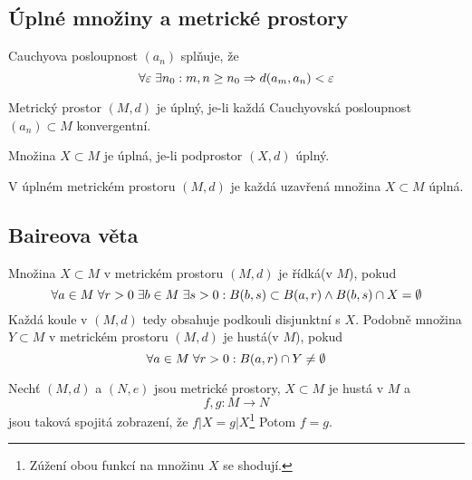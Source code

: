 \documentclass[../main.tex]{subfiles}
\begin{document}
\subsection{Úplné množiny a metrické prostory}

\begin{definition}
    Cauchyova posloupnost $(a_n)$ splňuje, že
    \[ \forall \varepsilon \hspace{1mm} \exists n_0: m,n \geq n_0 \Rightarrow d(a_m,a_n) < \varepsilon \]
\end{definition}

\begin{definition}
    Metrický prostor $(M,d)$ je úplný, je-li každá Cauchyovská posloupnost $(a_n) \subset M$ konvergentní.
\end{definition}

\begin{definition}
    Množina $X \subset M$ je úplná, je-li podprostor $(X,d)$ úplný.
\end{definition}

\begin{lemma}
    V úplném metrickém prostoru $(M,d)$ je každá uzavřená množina $X \subset M$ úplná.
\end{lemma}

\subsection{Baireova věta}

\begin{definition}
    Množina $X \subset M$ v metrickém prostoru $(M,d)$ je řídká(v $M$), pokud
    \[ \forall a \in M \hspace{1mm} \forall r > 0 \hspace{1mm} \exists b \in M \hspace{1mm} \exists s > 0: B(b,s) \subset B(a,r) \land B(b,s) \cap X = \emptyset \]
    Každá koule v $(M,d)$ tedy obsahuje podkouli disjunktní s $X$.
    Podobně množina $Y \subset M$ v metrickém prostoru $(M,d)$ je hustá(v $M$), pokud
    \[ \forall a \in M \hspace{1mm} \forall r > 0: B(a,r) \cap Y \neq \emptyset \]
\end{definition}

\begin{lemma}
    Nechť $(M,d)$ a $(N,e)$ jsou metrické prostory, $X \subset M$ je hustá v $M$ a
    \[ f,g: M\to N \]
    jsou taková spojitá zobrazení, že $f|X = g|X$\footnote{Zúžení obou funkcí na množinu $X$ se shodují.} Potom $f=g$.
\end{lemma}
\end{document}
